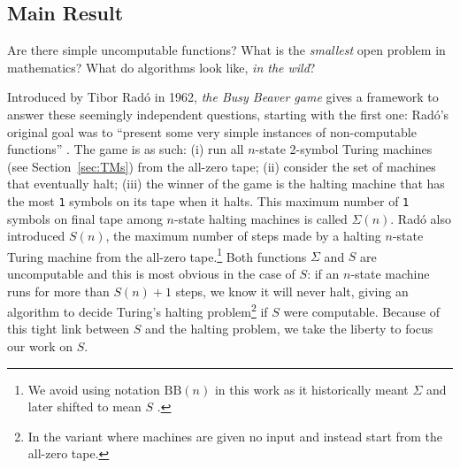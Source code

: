 \documentclass[a4paper,british]{article}
\theoremstyle{definition} %
\numberwithin{equation}{section}
\theoremstyle{definition} %
\newcommand{\sone}{\texttt{1}\xspace}
\newcommand{\radofull}{Tibor Rad\'o\xspace}
\newcommand{\rado}{Rad\'o\xspace}
\begin{document}
\subsection{Main Result}\label{sec:intro:mainresults}

\newcommand{\noncomput}{uncomputable\xspace}
\newcommand{\BBfull}{Busy Beaver\xspace}
\newcommand{\Coq}{Coq\xspace}
\newcommand{\CoqProofReleaseURL}{\url{https://github.com/ccz181078/Coq-BB5}}

\newcommand{\ie}{i.e.~}
\newcommand{\eg}{e.g.~}

Are there simple \noncomput functions? What is the \textit{smallest} open problem in mathematics? What do algorithms look like, \textit{in the wild}?

Introduced by \radofull in 1962, \textit{the \BBfull game} gives a framework to answer these seemingly independent questions, starting with the first one: \rado's original goal was to ``present some very simple instances of non-computable functions'' \cite{Rado_1962}. The game is as such: (i) run all $n$-state 2-symbol Turing machines (see Section~\ref{sec:TMs}) from the all-zero tape; (ii) consider the set of machines that eventually halt; (iii) the winner of the game is the halting machine that has the most \sone symbols on its tape when it halts. This maximum number of \sone symbols on final tape among $n$-state halting machines is called $\Sigma(n)$. \rado also introduced $S(n)$, the maximum number of steps made by a halting $n$-state Turing machine from the all-zero tape.\footnote{We avoid using notation $\text{BB}(n)$ in this work as it historically meant $\Sigma$ \cite{Rado_1962, 10.5555/1151785.1151794} and later shifted to mean $S$ \cite{BusyBeaverFrontier,sterin_2022_14955828}.} Both functions $\Sigma$ and $S$ are \noncomput and this is most obvious in the case of $S$: if an $n$-state machine runs for more than $S(n)+1$ steps, we know it will never halt, giving an algorithm to decide Turing's halting problem\footnote{In the variant where machines are given no input and instead start from the all-zero tape.} if $S$ were computable. Because of this tight link between $S$ and the halting problem, we take the liberty to focus our work on $S$.
\end{document}
